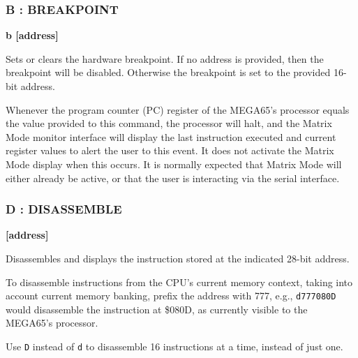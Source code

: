 \subsubsection{B : BREAKPOINT}
\begin{description}[leftmargin=2cm,style=nextline]
\item [Format:] {\bf b [address]}
\item [Usage:] Sets or clears the hardware breakpoint. If no address is provided,
  then the breakpoint will be disabled. Otherwise the breakpoint is set to the
  provided 16-bit address.

  Whenever the program counter (PC) register of the MEGA65's processor equals the value
  provided to this command, the processor will halt, and the Matrix Mode monitor interface
  will display the last instruction executed and current register values to alert the user
  to this event. It does not activate the Matrix Mode display when this occurs. It is
  normally expected that Matrix Mode will either already be active, or that the user is
  interacting via the serial interface.

\end{description}


\subsubsection{D : DISASSEMBLE}
\begin{description}[leftmargin=2cm,style=nextline]
\item [Format:] {\bf <d|D> [address]}
\item [Usage:] Disassembles and displays the instruction stored at the
  indicated 28-bit address.

  To disassemble instructions from the CPU's
  current memory context, taking into account current memory banking,
  prefix the address with 777, e.g., {\tt d777080D} would disassemble
  the instruction at \$080D, as currently visible to the MEGA65's
  processor.

  Use {\tt D} instead of {\tt d} to disassemble 16 instructions at a time, instead of just one.

\end{description}

